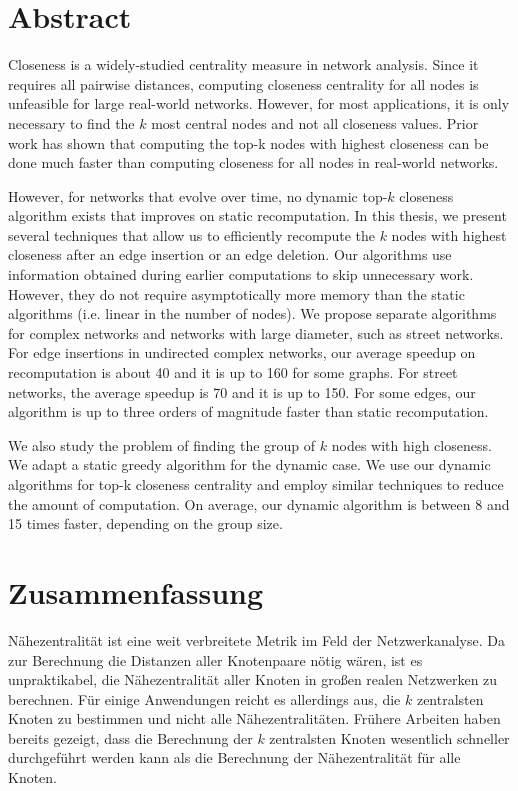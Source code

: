 


\chapter{Abstract}

Closeness is a widely-studied centrality measure in network analysis. Since it requires all pairwise distances, computing closeness centrality for all nodes is unfeasible for large real-world networks. However, for most applications, it is only necessary to find the $k$ most central nodes and not all closeness values. Prior work has shown that computing the top-k nodes with highest closeness can be done much faster than computing closeness for all nodes in real-world networks.

However, for networks that evolve over time, no dynamic top-$k$ closeness algorithm exists that improves on static recomputation. In this thesis, we present several techniques that allow us to efficiently recompute the $k$ nodes with highest closeness after an edge insertion or an edge deletion. Our algorithms use information obtained during earlier computations to skip unnecessary work. However, they do not require asymptotically more memory than the static algorithms (i.e. linear in the number of nodes). We propose separate algorithms for complex networks and networks with large diameter, such as street networks. For edge insertions in undirected complex networks, our average speedup on recomputation is about 40 and it is up to 160 for some graphs. For street networks, the average speedup is 70 and it is up to 150. For some edges, our algorithm is up to three orders of magnitude faster than static recomputation.

We also study the problem of finding the group of $k$ nodes with high closeness. We adapt a static greedy algorithm for the dynamic case. We use our dynamic algorithms for top-k closeness centrality and employ similar techniques to reduce the amount of computation. On average, our dynamic algorithm is between 8 and 15 times faster, depending on the group size.
\vspace{1cm}


\chapter{Zusammenfassung}\label{chap:abstract_german}

Nähezentralität ist eine weit verbreitete Metrik im Feld der Netzwerkanalyse. Da zur Berechnung die Distanzen aller Knotenpaare nötig wären, ist es unpraktikabel, die Nähezentralität aller Knoten in großen realen Netzwerken zu berechnen. Für einige Anwendungen reicht es allerdings aus, die $k$ zentralsten Knoten zu bestimmen und nicht alle Nähezentralitäten. Frühere Arbeiten haben bereits gezeigt, dass die Berechnung der $k$ zentralsten Knoten wesentlich schneller durchgeführt werden kann als die Berechnung der Nähezentralität für alle Knoten. 


